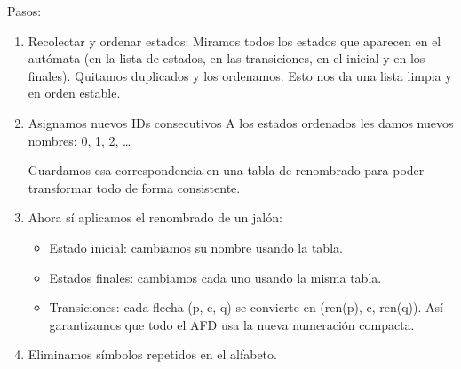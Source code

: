 Pasos:

\begin{enumerate}
    \item Recolectar y ordenar estados: Miramos todos los estados que aparecen en el autómata (en la lista de estados, en las transiciones, en el inicial y en los finales). Quitamos duplicados y los ordenamos. Esto nos da una lista limpia y en orden estable.
    \item Asignamos nuevos IDs consecutivos
    A los estados ordenados les damos nuevos nombres: 0, 1, 2, …

    Guardamos esa correspondencia en una tabla de renombrado para poder transformar todo de forma consistente.
    \item Ahora sí aplicamos el renombrado de un jalón:
    \begin{itemize}
        \item Estado inicial: cambiamos su nombre usando la tabla.
        \item Estados finales: cambiamos cada uno usando la misma tabla.
        \item Transiciones: cada flecha (p, c, q) se convierte en (ren(p), c, ren(q)). Así garantizamos que todo el AFD usa la nueva numeración compacta.
    \end{itemize}
    \item Eliminamos símbolos repetidos en el alfabeto. 
\end{enumerate}
